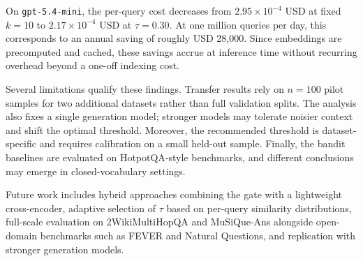 \documentclass[runningheads]{llncs}
\begin{document}
On \texttt{gpt-5.4-mini}, the per-query cost decreases from $2.95\times 10^{-4}$ USD at fixed $k{=}10$ to $2.17\times 10^{-4}$ USD at $\tau{=}0.30$. At one million queries per day, this corresponds to an annual saving of roughly USD 28{,}000. Since embeddings are precomputed and cached, these savings accrue at inference time without recurring overhead beyond a one-off indexing cost.

Several limitations qualify these findings. Transfer results rely on $n{=}100$ pilot samples for two additional datasets rather than full validation splits. The analysis also fixes a single generation model; stronger models may tolerate noisier context and shift the optimal threshold. Moreover, the recommended threshold is dataset-specific and requires calibration on a small held-out sample. Finally, the bandit baselines are evaluated on HotpotQA-style benchmarks, and different conclusions may emerge in closed-vocabulary settings.

Future work includes hybrid approaches combining the gate with a lightweight cross-encoder, adaptive selection of $\tau$ based on per-query similarity distributions, full-scale evaluation on 2WikiMultiHopQA and MuSiQue-Ans alongside open-domain benchmarks such as FEVER and Natural Questions, and replication with stronger generation models.



\end{document}
